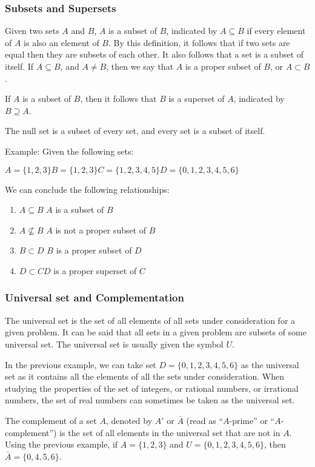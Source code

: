 \subsubsection{Subsets and Supersets}
Given two sets $A$ and $B$, $A$ is a subset of $B$, indicated by $A\subseteq B$ if every element of $A$ is also an element of $B$. By this definition, it follows that if two sets are equal then they are subsets of each other. It also follows that a set is a subset of itself. If $A\subseteq B$, and $A\neq B$, then we say that $A$ is a proper subset of $B$, or $A\subset B$.

If $A$ is a subset of $B$, then it follows that $B$ is a superset of $A$, indicated by $B\supseteq A$.

The null set is a subset of every set, and every set is a subset of itself.

Example: Given the following sets:

$A = \{1, 2, 3\}	$\hfil $B = \{1, 2, 3\}$\hfil	$C = \{1, 2, 3, 4, 5\}$\hfil	$D = \{0, 1, 2, 3, 4, 5, 6\}$

We can conclude the following relationships:
\begin{enumerate}
\item $A\subseteq B$ \qquad		$A$ is a subset of $B$
\item $A\not\subseteq B$ \qquad	$A$ is not a proper subset of $B$
\item $B\subset D$	\qquad $B$ is a proper subset of $D$
\item $D\subset C$\qquad $D$ is a proper superset of $C$
\end{enumerate}

\subsubsection{Universal set and Complementation}
The universal set is the set of all elements of all sets under consideration for a given problem. It can be said that all sets in a given problem are subsets of some universal set. The universal set is usually given the symbol $U$.

In the previous example, we can take set $D = \{0, 1, 2, 3, 4, 5, 6\}$ as the universal set as it contains all the elements of all the sets under consideration. When studying the properties of the set of integers, or rational numbers, or irrational numbers, the set of real numbers can sometimes be taken as the universal set.

The complement of a set $A$, denoted by $A'$ or $\bar{A}$ (read as “$A$-prime” or “$A$-complement”) is the set of all elements in the universal set that are not in $A$. Using the previous example, if $A = \{1, 2, 3\}$ and $U = \{0, 1, 2, 3, 4, 5, 6\}$, then $\bar{A}=\{0,4,5,6\}$.

